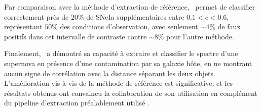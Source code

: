 \documentclass[../main/main.tex]{subfiles}
\begin{document}
Par comparaison avec la méthode d'extraction de référence,
\hypergal\ permet de classifier correctement près de $20\%$ de SNeIa
supplémentaires entre $0.1<c<0.6$, représentant $50\%$ des conditions
d'observation, avec seulement $\sim4\%$ de faux positifs dans cet
intervalle de contraste contre
$\sim8\%$ pour l'autre méthode.

Finalement, \hypergal\ a démontré sa capacité à extraire et
classifier le spectre d'une
supernova en présence d'une contamination par sa galaxie hôte, en ne
montrant aucun signe de corrélation avec la distance séparant les deux
objets. L'amélioration vis à vis de la méthode de référence est
significative, et les résultats obtenus ont convaincu la collaboration
de son utilisation en complément du pipeline d'extraction préalablement utilisé \pysedm.

%
%
\end{document}
